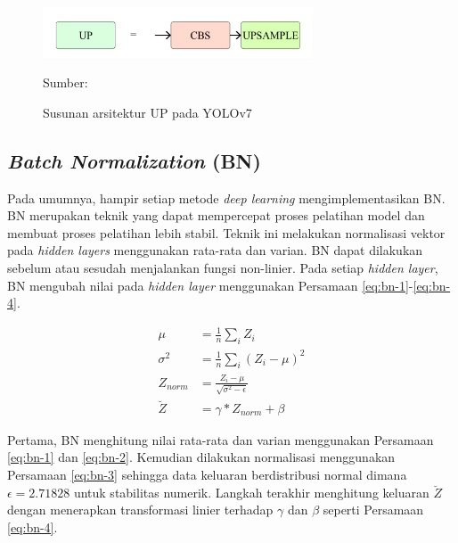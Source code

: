     \begin{figure}[H]
        \begin{center}
            \includegraphics[width=8cm]{img/bab2/up.png}
            \caption{Susunan arsitektur UP pada YOLOv7}
            \label{fig:up}
            Sumber: \citep{Wang2022}
        \end{center}
    \end{figure}    

    \subsection{\textit{Batch Normalization} (BN)}
    Pada umumnya, hampir setiap metode \textit{deep learning} mengimplementasikan BN. BN merupakan teknik yang dapat mempercepat proses pelatihan model dan membuat proses pelatihan lebih stabil. Teknik ini melakukan normalisasi vektor pada \textit{hidden layers} menggunakan rata-rata dan varian. BN dapat dilakukan sebelum atau sesudah menjalankan fungsi non-linier. Pada setiap \textit{hidden layer}, BN mengubah nilai pada \textit{hidden layer} menggunakan Persamaan \ref{eq:bn-1}-\ref{eq:bn-4}.

    \begin{align}
        \label{eq:bn-1}
        \mu &= \frac{1}{n} \sum_i Z_{i}\\
        \label{eq:bn-2}
        \sigma^2 &= \frac{1}{n} \sum_i (Z_{i}-\mu)^2\\
        \label{eq:bn-3}
        Z_{norm} &= \frac{Z_{i}-\mu}{\sqrt{\sigma^2-\epsilon}}\\
        \label{eq:bn-4}
        \breve{Z} &= \gamma \ast Z_{norm}+\beta
    \end{align}

    Pertama, BN menghitung nilai rata-rata dan varian menggunakan Persamaan \ref{eq:bn-1} dan \ref{eq:bn-2}. Kemudian dilakukan normalisasi menggunakan Persamaan \ref{eq:bn-3} sehingga data keluaran berdistribusi normal dimana $\epsilon = 2.71828$ untuk stabilitas numerik. Langkah terakhir menghitung keluaran $\breve{Z}$ dengan menerapkan transformasi linier terhadap $\gamma$ dan $\beta$ seperti Persamaan \ref{eq:bn-4}.

